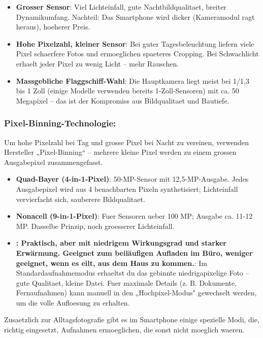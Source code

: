 \begin{itemize}
  \item \textbf{Grosser Sensor}: Viel Lichteinfall, gute Nachtbildqualitaet, breiter Dynamikumfang. Nachteil: Das Smartphone wird dicker (Kameramodul ragt heraus), hoeherer Preis.
  \item \textbf{Hohe Pixelzahl, kleiner Sensor}: Bei guter Tagesbeleuchtung liefern viele Pixel schaerfere Fotos und ermoeglichen spaeteres Cropping. Bei Schwachlicht erhaelt jeder Pixel zu wenig Licht – mehr Rauschen.
  \item \textbf{Massgebliche Flaggschiff-Wahl}: Die Hauptkamera liegt meist bei 1/1,3 bis 1 Zoll (einige Modelle verwenden bereits 1-Zoll-Sensoren) mit ca. 50 Megapixel – das ist der Kompromiss aus Bildqualitaet und Bautiefe.
\end{itemize}

\subsubsection*{Pixel-Binning-Technologie:}

Um hohe Pixelzahl bei Tag und grosse Pixel bei Nacht zu vereinen, verwenden Hersteller „Pixel-Binning“ – mehrere kleine Pixel werden zu einem grossen Ausgabepixel zusammengefasst.

\begin{itemize}
  \item \textbf{Quad-Bayer (4-in-1-Pixel)}: 50-MP-Sensor mit 12,5-MP-Ausgabe. Jedes Ausgabepixel wird aus 4 benachbarten Pixeln synthetisiert; Lichteinfall vervierfacht sich, sauberere Bildqualitaet.
  \item \textbf{Nonacell (9-in-1-Pixel)}: Fuer Sensoren ueber 100 MP; Ausgabe ca. 11-12 MP. Dasselbe Prinzip, noch groesserer Lichteinfall.
  \item \textbf{: Praktisch, aber mit niedrigem Wirkungsgrad und starker Erwärmung. Geeignet zum beiläufigen Aufladen im Büro, weniger geeignet, wenn es eilt, aus dem Haus zu kommen.}: Im Standardaufnahmemodus erhaeltst du das gebinnte niedrigapixelige Foto – gute Qualitaet, kleine Datei. Fuer maximale Details (z. B. Dokumente, Fernaufnahmen) kann manuell in den „Hochpixel-Modus" gewechselt werden, um die volle Aufloesung zu erhalten.
\end{itemize}


Zusaetzlich zur Alltagsfotografie gibt es im Smartphone einige spezielle Modi, die, richtig eingesetzt, Aufnahmen ermoeglichen, die sonst nicht moeglich waeren.

